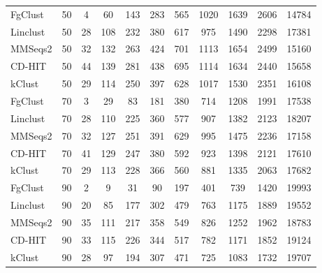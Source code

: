 \documentclass[11pt,letterpaper]{llncs2e/llncs}
\begin{document}
\begin{table}[t]
\begin{tabular}{l c c c c c c c c c c}
		FgClust & 50 & 4 & 60 & 143 & 283 & 565 & 1020 & 1639 & 2606 & 14784 \\
		Linclust & 50 & 28 & 108 & 232 & 380 & 617 & 975 & 1490 & 2298 & 17381 \\
		MMSeqs2 & 50 & 32 & 132 & 263 & 424 & 701 & 1113 & 1654 & 2499 & 15160 \\
		CD-HIT & 50 & 44 & 139 & 281 & 438 & 695 & 1114 & 1634 & 2440 & 15658 \\
		kClust & 50 & 29 & 114 & 250 & 397 & 628 & 1017 & 1530 & 2351 & 16108 \\
		\noalign{\vskip 2mm} 
		FgClust & 70 & 3 & 29 & 83 & 181 & 380 & 714 & 1208 & 1991 & 17538 \\
		Linclust & 70 & 28 & 110 & 225 & 360 & 577 & 907 & 1382 & 2123 & 18207 \\
		MMSeqs2 & 70 & 32 & 127 & 251 & 391 & 629 & 995 & 1475 & 2236 & 17158 \\
		CD-HIT & 70 & 41 & 129 & 247 & 380 & 592 & 923 & 1398 & 2121 & 17610 \\
		kClust & 70 & 29 & 113 & 228 & 366 & 560 & 881 & 1335 & 2063 & 17682 \\
		\noalign{\vskip 2mm} 
		FgClust & 90 & 2 & 9 & 31 & 90 & 197 & 401 & 739 & 1420 & 19993 \\
		Linclust & 90 & 20 & 85 & 177 & 302 & 479 & 763 & 1175 & 1889 & 19552 \\
		MMSeqs2 & 90 & 35 & 111 & 217 & 358 & 549 & 826 & 1252 & 1962 & 18783 \\
		CD-HIT & 90 & 33 & 115 & 226 & 344 & 517 & 782 & 1171 & 1852 & 19124 \\
		kClust & 90 & 28 & 97 & 194 & 307 & 471 & 725 & 1083 & 1732 & 19707 \\
		
		\bottomrule
	\end{tabular}
	\label{table:pdb-appendix}
\end{table}
\end{document}
